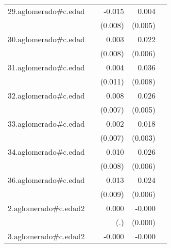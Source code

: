 {\begin{longtable}{l*{4}{D{.}{.}{-1}}}
\addlinespace
29.aglomerado#c.edad&                     &      -0.015         &       0.004         &                     \\
            &                     &     (0.008)         &     (0.005)         &                     \\
\addlinespace
30.aglomerado#c.edad&                     &       0.003         &       0.022\sym{***}&                     \\
            &                     &     (0.008)         &     (0.006)         &                     \\
\addlinespace
31.aglomerado#c.edad&                     &       0.004         &       0.036\sym{***}&                     \\
            &                     &     (0.011)         &     (0.008)         &                     \\
\addlinespace
32.aglomerado#c.edad&                     &       0.008         &       0.026\sym{***}&                     \\
            &                     &     (0.007)         &     (0.005)         &                     \\
\addlinespace
33.aglomerado#c.edad&                     &       0.002         &       0.018\sym{***}&                     \\
            &                     &     (0.007)         &     (0.003)         &                     \\
\addlinespace
34.aglomerado#c.edad&                     &       0.010         &       0.026\sym{***}&                     \\
            &                     &     (0.008)         &     (0.006)         &                     \\
\addlinespace
36.aglomerado#c.edad&                     &       0.013         &       0.024\sym{***}&                     \\
            &                     &     (0.009)         &     (0.006)         &                     \\
\addlinespace
2.aglomerado#c.edad2&                     &       0.000         &      -0.000         &                     \\
            &                     &         (.)         &     (0.000)         &                     \\
\addlinespace
3.aglomerado#c.edad2&                     &      -0.000         &      -0.000\sym{***}&                     \\

\end{longtable}}

